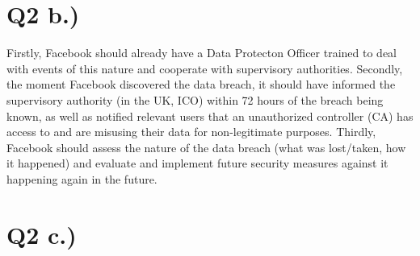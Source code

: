 \documentclass[a4wide, 10pt]{article}
\begin{document}
\section*{Q2 b.)}

Firstly, Facebook should already have a Data Protecton Officer trained to deal with events of this nature and cooperate with supervisory authorities. Secondly, the moment Facebook discovered the data breach, it should have informed the supervisory authority (in the UK, ICO) within 72 hours of the breach being known, as well as notified relevant users that an unauthorized controller (CA) has access to and are misusing their data for non-legitimate purposes. Thirdly, Facebook should assess the nature of the data breach (what was lost/taken, how it happened) and evaluate and implement future security measures against it happening again in the future.

\section*{Q2 c.)}
\end{document}
